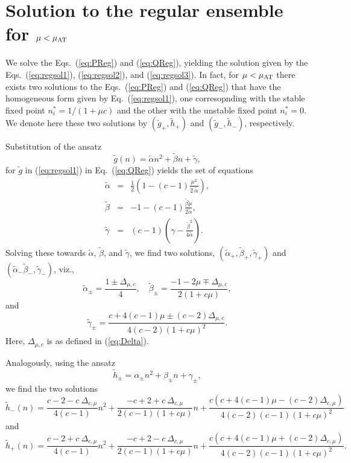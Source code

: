 \documentclass[11pt,a4paper]{article}
\begin{document}
\section{Solution to the regular ensemble for $\mu<\mu_{\rm AT}$}\label{app:regular}
We solve the Eqs.~(\ref{eq:PReg}) and (\ref{eq:QReg}), yielding the solution given by the Eqs.~(\ref{eq:regsol1}), (\ref{eq:regsol2}),   and (\ref{eq:regsol3}).  
In fact,   for   $\mu<\mu_{\rm AT}$ there exists two  solutions to the Eqs.~(\ref{eq:PReg}) and (\ref{eq:QReg}) that have the  homogeneous form given by Eq.~(\ref{eq:regsol1}), one corresopnding with the stable fixed point $n^\ast_i=1/(1+\mu c)$ and the other with the unstable fixed point $n^\ast_i = 0$. We denote here these two solutions by     $(\tilde{g}_+,\tilde{h}_+)$ and $(\tilde{g}_-, \tilde{h}_-)$, respectively.   






Substitution of the ansatz
\begin{equation}
\tilde{g}(n) = \tilde{\alpha} n^2 + \tilde{\beta}  n + \tilde{\gamma}  ,
\end{equation}  
for   $\tilde{g}$  in (\ref{eq:regsol1}) in Eq.~(\ref{eq:QReg}) yields the set of equations  
\begin{eqnarray}
\tilde{\alpha} &=& \frac{1}{2} \left(1 - (c-1)\frac{\mu^2}{2\:\tilde{\alpha}  }\right), \\ 
\tilde{\beta} &=& -1 - (c-1) \frac{\tilde{\beta}   \mu}{2 \tilde{\alpha} }, \\ 
\tilde{\gamma} &=&  (c-1)\left(\gamma   - \frac{\tilde{\beta}^2 }{4\tilde{\alpha} }\right).  
\end{eqnarray}
Solving these towards $\tilde{\alpha}$, $\tilde{\beta}$, and $\tilde{\gamma}$, we find two solutions, $(\tilde{\alpha}_+,\tilde{\beta}_+,\tilde{\gamma}_+)$ and $(\tilde{\alpha}_-\tilde{\beta}_-,\tilde{\gamma}_-)$, viz.,  
\begin{equation}
\tilde{\alpha}_\pm = \frac{1\pm\Delta_{\mu, c}}{4} , \quad 
\tilde{\beta}_\pm = \frac{-1-2\mu\mp \Delta_{\mu,c}}{2(1+c\mu)},
\end{equation}
and 
\begin{equation}
\tilde{\gamma}_{\pm} = \frac{c+4(c-1)\mu \pm (c-2)\Delta_{\mu, c}}{4(c-2)(1+c\mu)^2}.
\end{equation}
Here,  $\Delta_{\mu,c}$ is  as defined in (\ref{eq:Delta}).  


Analogously, using the ansatz 
\begin{equation}
\tilde{h}_{\pm} = \alpha_{\pm} n^2 + \beta_{\pm} n + \gamma_{\pm},
\end{equation} 
we find the two solutions 
\begin{equation}
\tilde{h}_-(n) = \frac{c-2-c\: \Delta_{c,\mu}}{4(c-1)}n^2 + \frac{-c+2+c\: \Delta_{c,\mu}}{2(c-1)(1+c\mu)}n  +  \frac{c(c+4(c-1)\mu-(c-2)\Delta_{c,\mu})}{4(c-2)(c-1)(1+c\mu)^2}
\end{equation}
and 
\begin{equation}
\tilde{h}_+(n) = \frac{c-2+c\: \Delta_{c,\mu}}{4(c-1)}n^2 + \frac{-c+2-c\: \Delta_{c,\mu}}{2(c-1)(1+c\mu)}n +  \frac{c(c+4(c-1)\mu+(c-2)\Delta_{c,\mu})}{4(c-2)(c-1)(1+c\mu)^2}. 
\end{equation}
\end{document}
